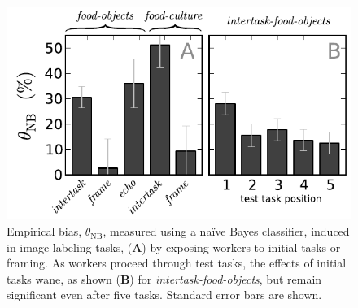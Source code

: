 \documentclass[12pt]{article}
\begin{document}
\begin{figure}
	\centering
	\includegraphics[scale=1]{figs/theta.pdf}
	\caption{
		Empirical bias, $\theta_\mathrm{NB}$, measured using a na\"ive Bayes 
		classifier, induced in image labeling tasks,
		(\textbf{A}) by exposing workers to initial tasks or framing. 
		As workers proceed through test tasks, the effects of initial tasks 
		wane, as shown (\textbf{B}) for \textit{intertask-food-objects}, but 
		remain significant even after five tasks.  Standard error bars are 
		shown.
	}
	\label{fig:theta}
\end{figure}
\end{document}
